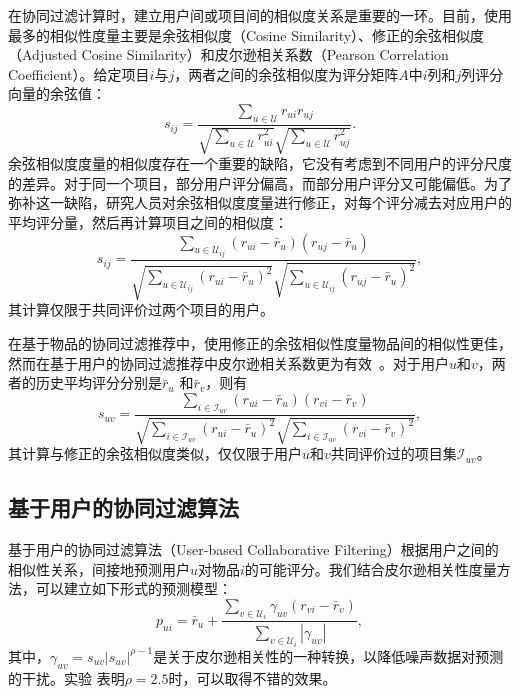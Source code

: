 在协同过滤计算时，建立用户间或项目间的相似度关系是重要的一环。目前，使用最多的相似性度量主要是余弦相似度（Cosine Similarity）、修正的余弦相似度（Adjusted Cosine Similarity）和皮尔逊相关系数（Pearson Correlation Coefficient）。给定项目$i$与$j$，两者之间的余弦相似度为评分矩阵$A$中$i$列和$j$列评分向量的余弦值：
\begin{equation}
    s_{ij} = \frac{\sum\limits_{u\in \mathcal U} r_{ui} r_{uj}}{\sqrt{\sum\limits_{u\in \mathcal U} r_{ui}^2}\sqrt{\sum\limits_{u\in \mathcal U}r_{uj}^2}}.
\end{equation}
余弦相似度度量的相似度存在一个重要的缺陷，它没有考虑到不同用户的评分尺度的差异。对于同一个项目，部分用户评分偏高，而部分用户评分又可能偏低。为了弥补这一缺陷，研究人员对余弦相似度度量进行修正，对每个评分减去对应用户的平均评分量，然后再计算项目之间的相似度：
\begin{equation}
    s_{ij} = \frac{\sum\limits_{u\in \mathcal U_{ij}} (r_{ui} - \bar r_u) (r_{uj} - \bar r_u)}{\sqrt{\sum\limits_{u\in \mathcal U_{ij}} (r_{ui}-\bar r_u)^2}\sqrt{\sum\limits_{u\in \mathcal U_{ij}}(r_{uj}-\bar r_u)^2}},
\end{equation}
其计算仅限于共同评价过两个项目的用户。

在基于物品的协同过滤推荐中，使用修正的余弦相似性度量物品间的相似性更佳，然而在基于用户的协同过滤推荐中皮尔逊相关系数更为有效~\cite{jannach2010recommender}。对于用户$u$和$v$，两者的历史平均评分分别是$\bar r_u$ 和$\bar r_v$，则有
\begin{equation}
    s_{uv} = \frac{\sum\limits_{i\in \mathcal I_{uv}} (r_{ui} - \bar r_u) (r_{vi} - \bar r_v)}{\sqrt{\sum\limits_{i\in \mathcal I_{uv}} (r_{ui}-\bar r_u)^2}\sqrt{\sum\limits_{i\in \mathcal I_{uv}}(r_{vi}-\bar r_v)^2}},
\end{equation}
其计算与修正的余弦相似度类似，仅仅限于用户$u$和$v$共同评价过的项目集$\mathcal I_{uv}$。

\subsection{基于用户的协同过滤算法}
基于用户的协同过滤算法（User-based Collaborative Filtering）根据用户之间的相似性关系，间接地预测用户$u$对物品$i$的可能评分。我们结合皮尔逊相关性度量方法，可以建立如下形式的预测模型：
\begin{equation}
    p_{ui} = \bar r_u + \frac{\sum\limits_{v \in \mathcal U_i} \gamma_{uv} (r_{vi} - \bar r_v)}{\sum\limits_{v \in \mathcal U_i} |\gamma_{uv}|},
\end{equation}
其中，$\gamma_{uv}=s_{uv}|s_{uv}|^{\rho-1}$是关于皮尔逊相关性的一种转换，以降低噪声数据对预测的干扰。实验
\cite{breese1998empirical,lemire2005slope}表明$\rho=2.5$时，可以取得不错的效果。

